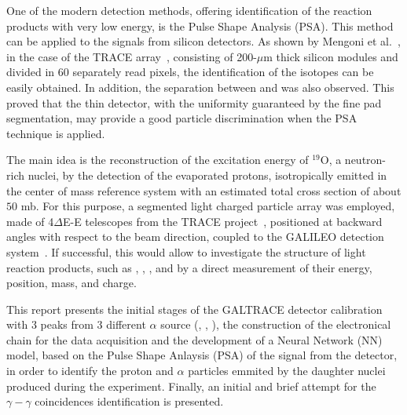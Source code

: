 One of the modern detection methods, offering identification of the reaction
products with very low energy, is the Pulse Shape Analysis (PSA). This method
can be applied to the signals from silicon detectors. As shown by Mengoni et
al.~\cite{mengoni}, in the case of the TRACE array~\cite{mengoni}, consisting
of 200-$\mu$m thick silicon modules and divided in 60 separately read pixels,
the identification of the  isotopes can be easily obtained.
In addition, the separation between  and  was also
observed. This proved that the thin detector, with the uniformity guaranteed
by the fine pad segmentation, may provide a good particle discrimination when
the PSA technique is applied.

\bigbreak

The main idea is the reconstruction of the excitation energy of $^{19}$O,
a neutron-rich nuclei, by the detection of the evaporated protons,
isotropically emitted in the center of mass reference system with an estimated total cross section of about $50$ mb. For this purpose, a segmented light
charged particle array was employed, made of 4$\Delta$E-E telescopes from the
TRACE project~\cite{mengoni}, positioned at backward angles with respect to
the beam direction, coupled to the GALILEO detection system~\cite{galileo}.
If successful, this would allow to investigate the structure of light reaction
products, such as , , ,  and  by a direct
measurement of their energy, position, mass, and charge.

\bigbreak

This report presents the initial stages of the GALTRACE detector calibration
with 3 peaks from 3 different $\alpha$ source (, ,
), the construction of the electronical chain for the data
acquisition and the development of a Neural Network (NN) model, based on the
Pulse Shape Anlaysis (PSA) of the signal from the detector, in order to
identify the proton and $\alpha$ particles emmited by the daughter nuclei
produced during the experiment. Finally, an initial and brief attempt for the
$\gamma-\gamma$ coincidences identification is presented.